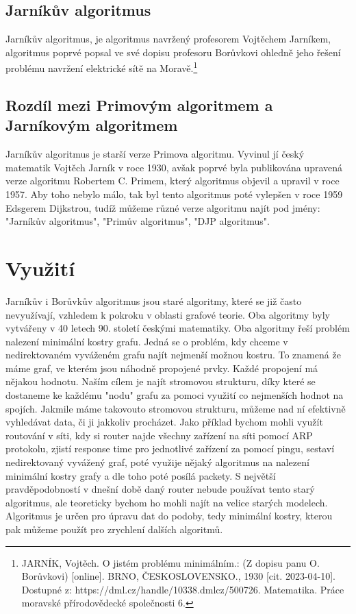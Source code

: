 \documentclass[11pt]{article}
\begin{document}
\subsection{Jarníkův algoritmus}
Jarníkův algoritmus, je algoritmus navržený profesorem Vojtěchem Jarníkem, algoritmus poprvé popsal ve své dopisu profesoru Borůvkovi ohledně jeho řešení problému navržení elektrické sítě na Moravě.\footnote{JARNÍK, Vojtěch. O jistém problému minimálním.: (Z dopisu panu O. Borůvkovi) [online]. BRNO, ČESKOSLOVENSKO., 1930 [cit. 2023-04-10]. Dostupné z: https://dml.cz/handle/10338.dmlcz/500726. Matematika. Práce moravské přírodovědecké společnosti 6.}

\subsection{Rozdíl mezi Primovým algoritmem a Jarníkovým algoritmem}
Jarníkův algoritmus je starší verze Primova algoritmu. Vyvinul jí český matematik Vojtěch Jarník v roce 1930,
avšak poprvé byla publikována upravená verze algoritmu Robertem C. Primem, který algoritmus objevil a upravil v roce
1957. Aby toho nebylo málo, tak byl tento algoritmus poté vylepšen v roce 1959 Edsgerem Dijkstrou, tudíž můžeme různé
verze algoritmu najít pod jmény: "Jarníkův algoritmus", "Primův algoritmus", "DJP algoritmus".

\pagebreak


\section{Využití}
Jarníkův i Borůvkův algoritmus jsou staré algoritmy, které se již často nevyužívají, vzhledem k pokroku 
v oblasti grafové teorie. Oba algoritmy byly vytvářeny v 40 letech 90. století českými matematiky.
Oba algoritmy řeší problém nalezení minimální kostry grafu. Jedná se o problém, kdy chceme v nedirektovaném
vyváženém grafu najít nejmenší možnou kostru. To znamená že máme graf, ve kterém jsou náhodně propojené prvky.
Každé propojení má nějakou hodnotu. Naším cílem je najít stromovou strukturu, díky které se dostaneme ke každému "nodu"
grafu za pomoci využití co nejmenších hodnot na spojích. Jakmile máme takovouto stromovou strukturu, můžeme nad ní efektivně 
vyhledávat data, či ji jakkoliv procházet. Jako příklad bychom mohli využít routování v síti, kdy si router najde
všechny zařízení na síti pomocí ARP protokolu, zjistí response time pro jednotlivé zařízení za pomocí pingu, 
sestaví nedirektovaný vyvážený graf, poté využije nějaký algoritmus na nalezení minimální kostry grafy a 
dle toho poté posílá packety. S největší pravděpodobností v dnešní době daný router nebude používat tento starý 
algoritmus, ale teoreticky bychom ho mohli najít na velice starých modelech. Algoritmus je určen pro úpravu dat do podoby, tedy minimální kostry, kterou pak můžeme použít pro zrychlení dalších algoritmů.
\end{document}
